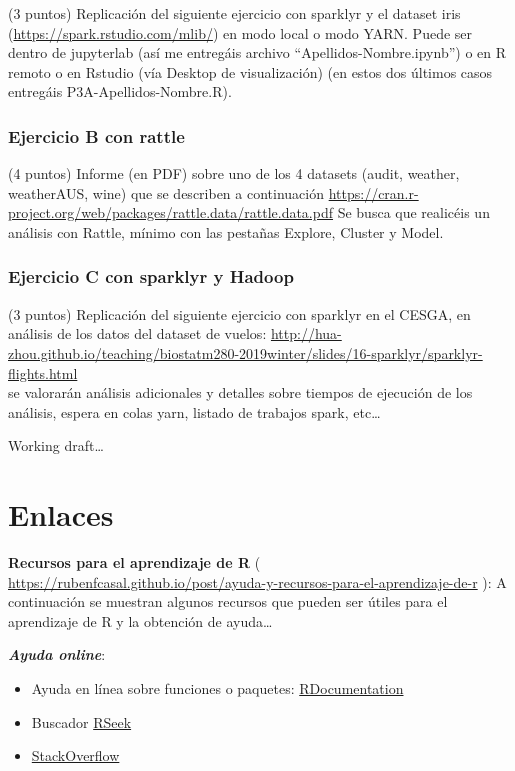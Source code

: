 \documentclass[]{book}
\begin{document}
(3 puntos) Replicación del siguiente ejercicio con sparklyr y el dataset
iris (\url{https://spark.rstudio.com/mlib/}) en modo local o modo YARN.
Puede ser dentro de jupyterlab (así me entregáis archivo
``Apellidos-Nombre.ipynb'') o en R remoto o en Rstudio (vía Desktop de
visualización) (en estos dos últimos casos entregáis
P3A-Apellidos-Nombre.R).

\subsection{Ejercicio B con rattle}\label{ejercicio-b-con-rattle}

(4 puntos) Informe (en PDF) sobre uno de los 4 datasets (audit, weather,
weatherAUS, wine) que se describen a continuación
\url{https://cran.r-project.org/web/packages/rattle.data/rattle.data.pdf}
Se busca que realicéis un análisis con Rattle, mínimo con las pestañas
Explore, Cluster y Model.

\subsection{Ejercicio C con sparklyr y
Hadoop}\label{ejercicio-c-con-sparklyr-y-hadoop}

(3 puntos) Replicación del siguiente ejercicio con sparklyr en el CESGA,
en análisis de los datos del dataset de vuelos:
\url{http://hua-zhou.github.io/teaching/biostatm280-2019winter/slides/16-sparklyr/sparklyr-flights.html}\\
se valorarán análisis adicionales y detalles sobre tiempos de ejecución
de los análisis, espera en colas yarn, listado de trabajos spark,
etc\ldots{}

\appendix


Working draft\ldots{}

\chapter{Enlaces}\label{links}

\textbf{Recursos para el aprendizaje de R} (
\url{https://rubenfcasal.github.io/post/ayuda-y-recursos-para-el-aprendizaje-de-r}
): A continuación se muestran algunos recursos que pueden ser útiles
para el aprendizaje de R y la obtención de ayuda\ldots{}

\textbf{\emph{Ayuda online}}:

\begin{itemize}
\item
  Ayuda en línea sobre funciones o paquetes:
  \href{https://www.rdocumentation.org/}{RDocumentation}
\item
  Buscador \href{http://rseek.org/}{RSeek}
\item
  \href{http://stackoverflow.com/questions/tagged/r}{StackOverflow}
\end{itemize}
\end{document}

